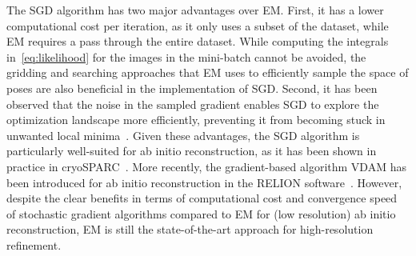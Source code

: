 \documentclass{article}
\begin{document}
The SGD algorithm has two major advantages over EM. First, it has a lower computational 
cost per iteration, as it only uses a subset of the dataset, while EM requires 
a pass through the entire dataset. While computing the integrals in~\eqref{eq:likelihood} 
for the images in the mini-batch cannot be avoided, the gridding and searching 
approaches that EM uses to efficiently sample the space of poses are also beneficial 
in the implementation of SGD.
Second, it has been observed that the noise in the sampled gradient 
enables SGD to explore the optimization landscape more efficiently, 
preventing it from 
becoming stuck in unwanted local minima~\cite{keskar_large-batch_2017, smith_bayesian_2018}.
Given these advantages, the SGD algorithm is particularly well-suited for ab initio 
reconstruction, as it has been shown in practice in cryoSPARC~\cite{punjani_cryosparc_2017}.
More recently, the gradient-based algorithm VDAM has been introduced for ab initio
reconstruction in the RELION software~\cite{kimanius_new_2021}. However, despite 
the clear benefits in terms of computational cost and convergence speed of stochastic 
gradient algorithms compared to EM for (low resolution) ab initio reconstruction, 
EM is still the state-of-the-art approach for high-resolution refinement. 
\end{document}
